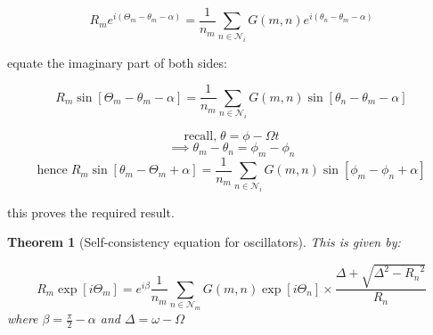 \documentclass{article}
\newtheorem{thm}{Theorem}[section]
\begin{document}
$$R_m e^{i(\Theta_m - \theta_m - \alpha)} = \frac{1}{n_m} \sum\limits_{n\in{\mathcal{N}_i}}^{} G(m,n) e^{i(\theta_n - \theta_m - \alpha)}  $$

equate the imaginary part of both sides:

$$R_m \sin[\Theta_m - \theta_m -\alpha] = \frac{1}{n_m} \sum\limits_{n\in{\mathcal{N}_i}}^{} G(m,n) \sin[\theta_n - \theta_m - \alpha]  $$


$$\text{recall,} \; \theta = \phi - \Omega t $$
$$\implies \theta_m - \theta_n = \phi_m - \phi_n$$
$$ \text{hence} \; R_m \sin[\theta_m - \Theta_m + \alpha] = \frac{1}{n_m} \sum\limits_{n\in{\mathcal{N}_i}}^{} G(m,n)\sin[\phi_m - \phi_n + \alpha]$$

this proves the required result.

\begin{thm}[Self-consistency equation for oscillators]
This is given by:

$$R_m\exp[i\Theta_m] = e^{i\beta}\frac{1}{n_m} \sum\limits_{n\in{\mathcal{N}_m}}^{} G(m,n)\exp[i\Theta_n] \times \frac{\Delta + \sqrt{ \Delta^2 - {R_n}^2}}{R_n}  $$
where $\beta = \frac{\pi}{2}-\alpha$ and $\Delta = \omega - \Omega$

\end{thm}
\end{document}
